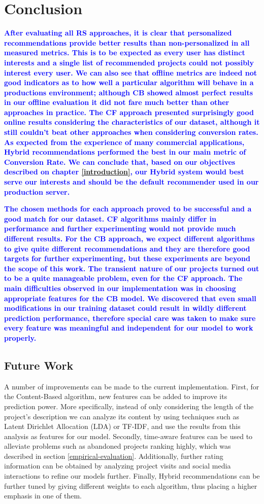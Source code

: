 \documentclass[cic,tc,english]{iiufrgs}
\newcommand{\adriano}[1]{\textcolor{blue}{\textbf{#1}}}
\begin{document}
\chapter{Conclusion}
\adriano{After evaluating all RS approaches, it is clear that personalized recommendations provide better results than non-personalized in all measured metrics. This is to be expected as every user has distinct interests and a single list of recommended projects could not possibly interest every user. We can also see that offline metrics are indeed not good indicators as to how well a particular algorithm will behave in a productions environment; although CB showed almost perfect results in our offline evaluation it did not fare much better than other approaches in practice. The CF approach presented surprisingly good online results considering the characteristics of our dataset, although it still couldn't beat other approaches when considering conversion rates. As expected from the experience of many commercial applications, Hybrid recommendations performed the best in our main metric of Conversion Rate. We can conclude that, based on our objectives described on chapter \ref{introduction}, our Hybrid system would best serve our interests and should be the default recommender used in our production server.}

\adriano{The chosen methods for each approach proved to be successful and a good match for our dataset. CF algorithms mainly differ in performance and further experimenting would not provide much different results. For the CB approach, we expect different algorithms to give quite different recommendations and they are therefore good targets for further experimenting, but these experiments are beyond the scope of this work. The transient nature of our projects turned out to be a quite manageable problem, even for the CF approach. The main difficulties observed in our implementation was in choosing appropriate features for the CB model. We discovered that even small modifications in our training dataset could result in wildly different prediction performance, therefore special care was taken to make sure every feature was meaningful and independent for our model to work properly.}
\section{Future Work}
A number of improvements can be made to the current implementation. First, for the Content-Based algorithm, new features can be added to improve its prediction power. More specifically, instead of only considering the length of the project's description we can analyze its content by using techniques such as Latent Dirichlet Allocation (LDA) or TF-IDF, and use the results from this analysis as features for our model. Secondly, time-aware features can be used to alleviate problems such as abandoned projects ranking highly, which was described in section \ref{empirical-evaluation}. Additionally, further rating information can be obtained by analyzing project visits and social media interactions to refine our models further. Finally, Hybrid recommendations can be further tuned by giving different weights to each algorithm, thus placing a higher emphasis in one of them.



\end{document}
